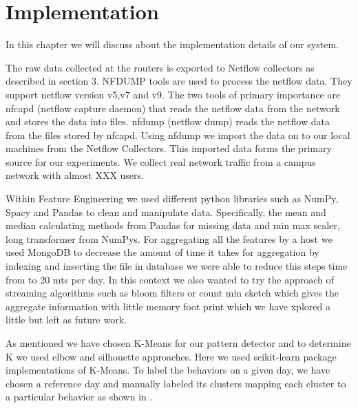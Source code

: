 
\chapter{Implementation}

In this chapter we will discuss about the implementation details of our system. 

The raw data collected at the routers is exported to Netflow
collectors as described in section 3. NFDUMP \cite{} tools are
used to process the netflow data. They support netflow version v5,v7
and v9. The two tools of primary importance are nfcapd
(netflow capture daemon) that reads the netflow data from
the network and stores the data into files. nfdump (netflow
dump) reads the netflow data from the files stored by nfcapd.
Using nfdump we import the data on to our local machines
from the Netflow Collectors. This imported data forms the
primary source for our experiments. We collect real network
traffic from a campus network with almost XXX users.

Within Feature Engineering we used different python libraries such as NumPy, Spacy and Pandas to clean and manipulate data. Specifically, the mean and median calculating methods from Pandas for missing data and min max scaler, long transformer from NumPys.
For aggregating all the features by a host we used MongoDB to decrease the amount of time it takes for aggregation by indexing \cite{} and inserting the file in database we were able to reduce this steps time from to 20 mts per day. In this context we also wanted to try the approach of streaming algorithms such as bloom filters or count min sketch which gives the aggregate information with little memory foot print which we have xplored a little but left as future work.

As mentioned we have chosen K-Means for our pattern detector and to determine K we used elbow and silhouette approaches. Here we used scikit-learn package implementations of K-Means. To label the behaviors on a given day, we have chosen a reference day and manually labeled its clusters mapping each cluster to a particular behavior as shown in .

